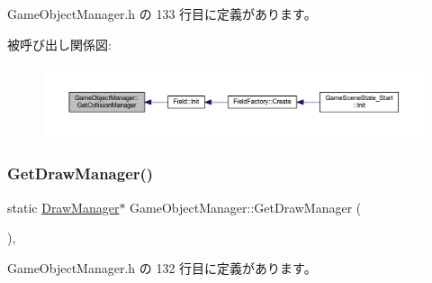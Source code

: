 Game\+Object\+Manager.\+h の 133 行目に定義があります。

被呼び出し関係図\+:\nopagebreak
\begin{figure}[H]
\begin{center}
\leavevmode
\includegraphics[width=350pt]{class_game_object_manager_a41775a8308691a84b468a0aeeb1b3376_icgraph}
\end{center}
\end{figure}
\mbox{\label{class_game_object_manager_a862e76bfd74495c20bddd377c62a22b7}} 
\subsubsection{\texorpdfstring{Get\+Draw\+Manager()}{GetDrawManager()}}
{\footnotesize\ttfamily static \mbox{\hyperlink{class_draw_manager}{Draw\+Manager}}$\ast$ Game\+Object\+Manager\+::\+Get\+Draw\+Manager (\begin{DoxyParamCaption}{ }\end{DoxyParamCaption})\hspace{0.3cm}{\ttfamily [inline]}, {\ttfamily [static]}}



 Game\+Object\+Manager.\+h の 132 行目に定義があります。

